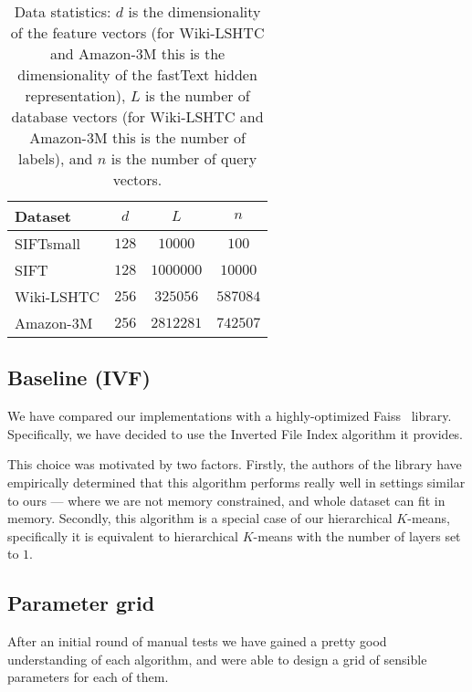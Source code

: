         \begin{table}
          \caption{Data statistics: $d$ is the dimensionality of the feature vectors (for Wiki-LSHTC and Amazon-3M this
          is the dimensionality of the fastText hidden representation), $L$ is the number
          of database vectors (for Wiki-LSHTC and Amazon-3M this is the number of labels), and $n$ is the number of query vectors.}
          \label{tab:dsz}
          \centering
          {
          \begin{tabular}{l|c|c|c|}
            Dataset & $d$ &$L$& $n$ \\
            \hline
            SIFTsmall   & $128$ & $10000$   & $100$    \\
            SIFT        & $128$ & $1000000$ & $10000$  \\
            Wiki-LSHTC  & $256$ & $325056$  & $587084$ \\
            Amazon-3M   & $256$ & $2812281$ & $742507$ \\
          \end{tabular}
          }
        \end{table}

    \subsection{Baseline (IVF)}\label{subsec:baselineivf}

        We have compared our implementations with a highly-optimized Faiss~\cite{faiss} library.
        Specifically, we have decided to use the Inverted File Index algorithm it provides.

        This choice was motivated by two factors.
        Firstly, the authors of the library have empirically determined that this algorithm performs
        really well in settings similar to ours --- where we are not memory constrained, and whole dataset
        can fit in memory.
        Secondly, this algorithm is a special case of our hierarchical $K$-means, specifically
        it is equivalent to hierarchical $K$-means with the number of layers set to $1$.

    \subsection{Parameter grid}\label{subsec:parameterGrid}

        After an initial round of manual tests we have gained a pretty good understanding of
        each algorithm, and were able to design a grid of sensible parameters for each of them.

